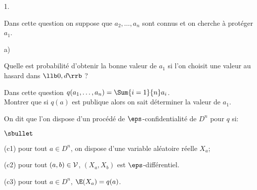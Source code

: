 \newpage


\begin{noliste}{1.}
  \setlength{\itemsep}{4mm} %
  \setcounter{enumi}{11}
\item Dans cette question on suppose que $a_2,\ldots,a_n$ sont connus et
  on cherche à protéger $a_1$.
  \begin{noliste}{a)}
  \setlength{\itemsep}{2mm} %
  \item Quelle est probabilité d'obtenir la bonne valeur de $a_1$ si
    l'on choisit une valeur au hasard dans $\llb 0, d \rrb$ ?

    




  \item Dans cette question $q(a_1,\ldots,a_n) = \Sum{i=1}{n} a_i$.\\
    Montrer que si $q(a)$ est publique alors on sait déterminer la
    valeur de $a_1$.

    
  \end{noliste}
\end{noliste}
On dit que l'on dispose d'un procédé de $\eps$-confidentialité de
$D^n$ pour $q$ si:
\begin{liste}{$\sbullet$}
\item[(c1)] pour tout $a\in D^n$, on dispose d'une variable aléatoire
  réelle $X_a$;
\item[(c2)] pour tout $(a,b) \in {\cal V}$, $(X_a,X_b)$ est
  $\eps$-différentiel.
\item[(c3)] pour tout $a\in D^n$, $\E(X_a) = q(a)$.
\end{liste}~\\[-.4cm]
